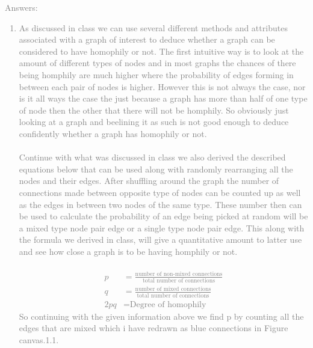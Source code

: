 \documentclass[11pt]{article}
\begin{document}
\textcolor{gray}{
Answers:
\begin{enumerate} 
		\item As discussed in class we can use several different methods and attributes associated with a graph of interest to deduce whether a graph can be considered to have homophily or not.  The first intuitive way is to look at the amount of different types of nodes  and in most graphs the chances of there being homphily are much higher where the probability of edges forming in between each pair of nodes is higher.  However this is not always the case, nor is it all ways the case the just because a graph has more than half of one type of node then the other that there will not be homphily.  So obviously just looking at a graph and beelining it as such is not good enough to deduce confidently whether a graph has homophily or not.\\\\
Continue with what was discussed in class we also derived the described equations below that can be used along with randomly rearranging all the nodes and their edges. After shuffling around the graph the number of connections made between opposite type of nodes can be counted up as well as the edges in between two nodes of the same type.  These number then can be used to calculate the probability of an edge being picked at random will be a mixed type node pair edge or a single type node pair edge. This along with the formula we derived in class, will give a quantitative amount to latter use and see how close a graph is to be having homphily or not.\\\\
	\begin{align}
		p 	&=	\frac{\text{number of non-mixed connections}}{\text{total number of connections}}\\
		q 	&=	\frac{\text{number of mixed connections}}{\text{total number of connections}}\\
		2pq &= \text{Degree of homophily}
	\end{align} 
So continuing with the given information above we find p by counting all the edges that are mixed which i have redrawn as blue connections in Figure canvas.1.1.\\\\
	\begin{center}

\end{center}
\end{enumerate}}
\end{document}
